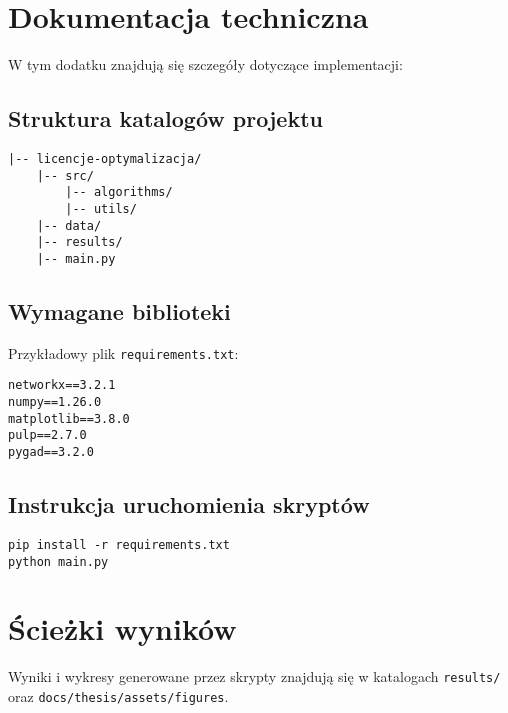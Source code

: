 \section{Dokumentacja techniczna}

W tym dodatku znajdują się szczegóły dotyczące implementacji:

\subsection{Struktura katalogów projektu}

\begin{verbatim}
|-- licencje-optymalizacja/
    |-- src/
        |-- algorithms/
        |-- utils/
    |-- data/
    |-- results/
    |-- main.py
\end{verbatim}

\subsection{Wymagane biblioteki}

Przykładowy plik \texttt{requirements.txt}:

\begin{verbatim}
networkx==3.2.1
numpy==1.26.0
matplotlib==3.8.0
pulp==2.7.0
pygad==3.2.0
\end{verbatim}

\subsection{Instrukcja uruchomienia skryptów}

\begin{verbatim}
pip install -r requirements.txt
python main.py
\end{verbatim}

\section{Ścieżki wyników}

Wyniki i wykresy generowane przez skrypty znajdują się w katalogach \texttt{results/} oraz \texttt{docs/thesis/assets/figures}.
